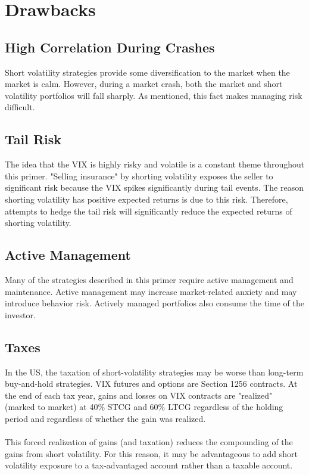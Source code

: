 \documentclass[11pt, oneside]{book}
\begin{document}
\section{Drawbacks} \label{Conclusion-Drawback}
\subsection{High Correlation During Crashes} \label{Conclusion-Drawback-Correlation}
Short volatility strategies provide some diversification to the market when the market is calm. However, during a market crash, both the market and short volatility portfolios will fall sharply. As mentioned, this fact makes managing risk difficult. 

\subsection{Tail Risk} \label{Conclusion-Drawback-TailRisk}
The idea that the VIX is highly risky and volatile is a constant theme throughout this primer. "Selling insurance" by shorting volatility exposes the seller to significant risk because the VIX spikes significantly during tail events. The reason shorting volatility has positive expected returns is due to this risk. Therefore, attempts to hedge the tail risk will significantly reduce the expected returns of shorting volatility. 

\subsection{Active Management} \label{Conclusion-Drawback-Management}
Many of the strategies described in this primer require active management and maintenance. Active management may increase market-related anxiety and may introduce behavior risk. Actively managed portfolios also consume the time of the investor.

\subsection{Taxes} \label{Conclusion-Drawback-Taxes}
In the US, the taxation of short-volatility strategies may be worse than long-term buy-and-hold strategies. VIX futures and options are Section 1256 contracts. At the end of each tax year, gains and losses on VIX contracts are "realized" (marked to market) at 40\% STCG and 60\% LTCG regardless of the holding period and regardless of whether the gain was realized.\\
\\
This forced realization of gains (and taxation) reduces the compounding of the gains from short volatility. For this reason, it may be advantageous to add short volatility exposure to a tax-advantaged account rather than a taxable account.
\appendix
\end{document}
